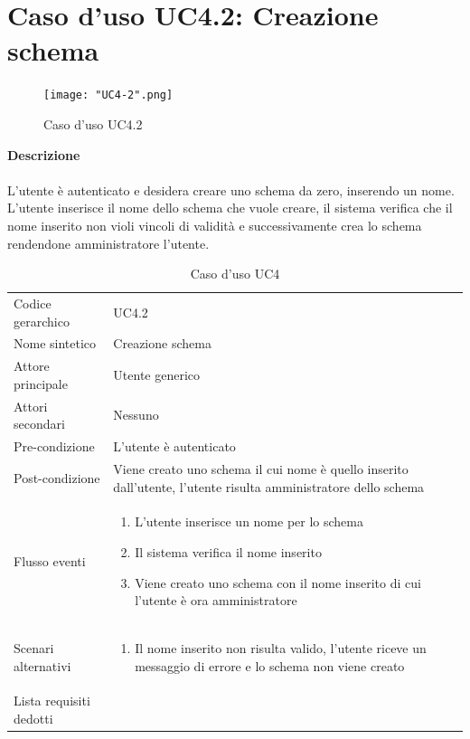\documentclass[a4paper]{report}
\begin{document}
	 \section{Caso d'uso UC4.2: Creazione schema}
	 	\begin{figure}[H]
			\centering
			\texttt{[image: "UC4-2".png]}
			\caption{Caso d'uso UC4.2}
		\end{figure}
	 \textbf{Descrizione} \\ \\
	 L'utente è autenticato e desidera creare uno schema da zero, inserendo un nome. L'utente inserisce il
	 nome dello schema che vuole creare, il sistema verifica che il nome inserito non violi vincoli di validità e
	 successivamente crea lo schema rendendone amministratore l'utente.
		\begin{table}[H]
		\begin{tabularx}{\textwidth}{X | X}\toprule
			\rowcolor{orange!65}Codice gerarchico & UC4.2 \\
			Nome sintetico & Creazione schema \\
			\rowcolor{orange!65}Attore principale & Utente generico\\
			Attori secondari & Nessuno \\
			\rowcolor{orange!65}Pre-condizione & L'utente è autenticato\\
			Post-condizione & Viene creato uno schema il cui nome è quello inserito dall'utente, l'utente
			risulta amministratore dello schema \\
			\rowcolor{orange!65}Flusso eventi & \begin{enumerate}
			\item L'utente inserisce un nome per lo schema
			\item Il sistema verifica il nome inserito
			\item Viene creato uno schema con il nome inserito di cui l'utente è ora amministratore
			\end{enumerate} \\
			Scenari alternativi & \begin{enumerate}
			\item Il nome inserito non risulta valido, l'utente riceve un messaggio di errore e lo schema non
			 viene creato
			\end{enumerate} \\
			\rowcolor{orange!65}Lista requisiti dedotti & \\
			\bottomrule
		\end{tabularx}
		\caption{Caso d'uso UC4}
	 \end{table}
\end{document}
